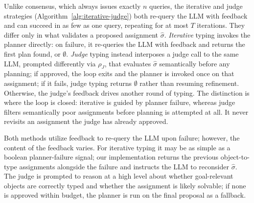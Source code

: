 Unlike consensus, which always issues exactly $n$ queries, the iterative and judge strategies (Algorithm~\ref{alg:iterative-judge}) both re-query the LLM with feedback and can succeed in as few as one query, repeating for at most $T$ iterations. They differ only in what validates a proposed assignment $\hat{\sigma}$. \emph{Iterative} typing invokes the planner directly: on failure, it re-queries the LLM with feedback and returns the first plan found, or $\emptyset$. \emph{Judge} typing instead interposes a judge call to the same LLM, prompted differently via $\rho_J$, that evaluates $\hat{\sigma}$ semantically before any planning; if approved, the loop exits and the planner is invoked once on that assignment; if it fails, judge typing returns $\emptyset$ rather than resuming refinement. Otherwise, the judge's feedback drives another round of typing. The distinction is where the loop is closed: iterative is guided by planner failure, whereas judge filters semantically poor assignments before planning is attempted at all. It never revisits an assignment the judge has already approved.

Both methods utilize feedback to re-query the LLM upon failure; however, the content of the feedback varies. For iterative typing it may be as simple as a boolean planner-failure signal; our implementation returns the previous object-to-type assignments alongside the failure and instructs the LLM to reconsider $\hat{\sigma}$. The judge is prompted to reason at a high level about whether goal-relevant objects are correctly typed and whether the assignment is likely solvable; if none is approved within budget, the planner is run on the final proposal as a fallback.

